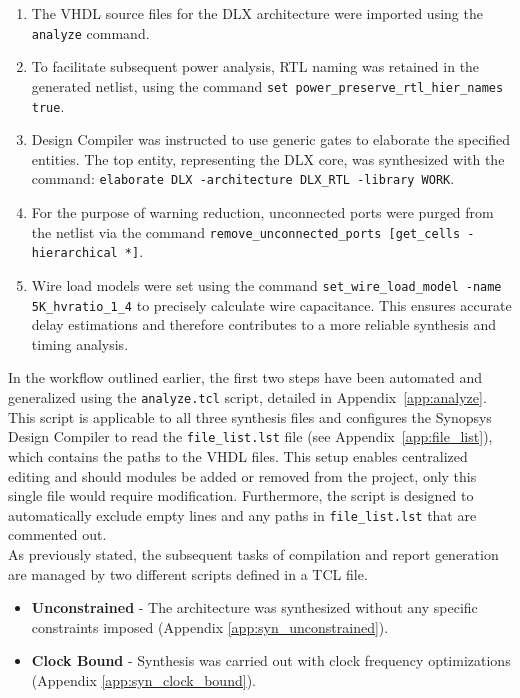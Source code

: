 \begin{enumerate}

	\item The VHDL source files for the DLX architecture were imported using the \texttt{analyze} command.

	\item To facilitate subsequent power analysis, RTL naming was retained in the generated netlist, using the command \texttt{set power\_preserve\_rtl\_hier\_names true}.

	\item Design Compiler was instructed to use generic gates to elaborate the specified entities. The top entity, representing the DLX core, was synthesized with the command: \texttt{elaborate DLX -architecture DLX\_RTL -library WORK}.

	\item For the purpose of warning reduction, unconnected ports were purged from the netlist via the command \texttt{remove\_unconnected\_ports [get\_cells -hierarchical *]}.

	\item Wire load models were set using the command \texttt{set\_wire\_load\_model -name 5K\_hvratio\_1\_4} to precisely calculate wire capacitance. This ensures accurate delay estimations and therefore contributes to a more reliable synthesis and timing analysis.

\end{enumerate}

In the workflow outlined earlier, the first two steps have been automated and generalized using the \texttt{analyze.tcl} script, detailed in Appendix~\ref{app:analyze}. This script is applicable to all three synthesis files and configures the Synopsys Design Compiler to read the \texttt{file\_list.lst} file (see Appendix~\ref{app:file_list}), which contains the paths to the VHDL files. This setup enables centralized editing and should modules be added or removed from the project, only this single file would require modification. Furthermore, the script is designed to automatically exclude empty lines and any paths in \texttt{file\_list.lst} that are commented out. \\

As previously stated, the subsequent tasks of compilation and report generation are managed by two different scripts defined in a TCL file.

\begin{itemize}

	\item \textbf{Unconstrained} - The architecture was synthesized without any specific constraints imposed (Appendix \ref{app:syn_unconstrained}).

	\item \textbf{Clock Bound} - Synthesis was carried out with clock frequency optimizations (Appendix \ref{app:syn_clock_bound}).

\end{itemize}

